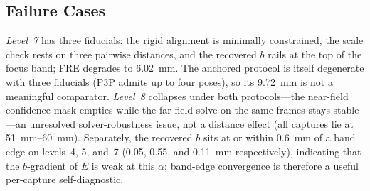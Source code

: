 \documentclass[conference]{IEEEtran}
\begin{document}
\subsection{Failure Cases}\label{sub:fail}
\emph{Level~7} has three fiducials: the rigid alignment is minimally
constrained, the scale check rests on three pairwise distances, and the
recovered $b$ rails at the top of the focus band; FRE degrades to
\SI{6.02}{\milli\meter}.  The anchored protocol is itself degenerate with
three fiducials (P3P admits up to four poses), so its
\SI{9.72}{\milli\meter} is not a meaningful comparator.  \emph{Level~8}
collapses under both protocols---the near-field confidence mask empties
while the far-field solve on the same frames stays stable---an unresolved
solver-robustness issue, not a distance effect (all captures lie at
\SIrange{51}{60}{\milli\meter}).  Separately, the recovered $b$ sits at
or within \SI{0.6}{\milli\meter} of a band edge on levels~4, 5, and~7
(0.05, 0.55, and \SI{0.11}{\milli\meter} respectively), indicating that
the $b$-gradient of $E$ is weak at this $\alpha$; band-edge convergence
is therefore a useful per-capture self-diagnostic.
\end{document}
